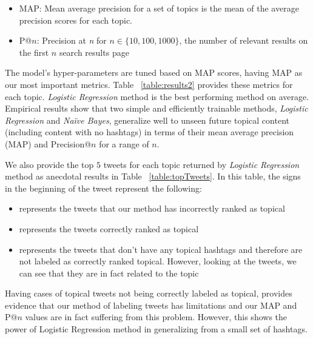 \begin{itemize}
\item MAP: Mean average precision for a set of topics is the mean of the average precision scores for each topic.
\item P@$n$: Precision at \textit{n} for $n \in \{ 10, 100, 1000 \}$, the number of relevant results on the first $n$ search results page
\end{itemize}

The model's hyper-parameters are tuned based on MAP scores, having MAP as our most important metrics. Table ~\ref{table:results2} provides these metrics for each topic. \textit{Logistic Regression} method is the best performing method on average. Empirical results show that two simple and efficiently trainable methods, \textit{Logistic Regression} and \textit{Na\"{i}ve Bayes}, generalize well to unseen future topical content (including content with no hashtags) in terms of their mean average precision (MAP) and Precision@$n$ for a range of $n$.

We also provide the top $5$ tweets for each topic returned by \textit{Logistic Regression} method as anecdotal results in Table ~\ref{table:topTweets}. In this table, the signs in the beginning of the tweet represent the following:
\begin{itemize}
\item \xmark represents the tweets that our method has incorrectly ranked as topical
\item \checkmark represents the tweets correctly ranked as topical
\item \starmark represents the tweets that don't have any topical hashtags and therefore are not labeled as correctly ranked topical. However, looking at the tweets, we can see that they are in fact related to the topic
\end{itemize}  

Having cases of topical tweets not being correctly labeled as topical, provides evidence that our method of labeling tweets has limitations and our MAP and P@$n$ values are in fact suffering from this problem. However, this shows the power of Logistic Regression method in generalizing from a small set of hashtags.

